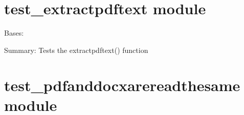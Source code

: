 \documentclass[letterpaper,10pt,english]{sphinxmanual}
\begin{document}
\section{test\_extractpdftext module}
\label{\detokenize{unit_tests:test-extractpdftext-module}}\label{\detokenize{unit_tests:module-unit_tests.test_extractpdftext}}

\begin{fulllineitems}
\label{\detokenize{unit_tests:unit_tests.test_extractpdftext.TestExtractpdftext}}
Bases: 

\begin{fulllineitems}
\label{\detokenize{unit_tests:unit_tests.test_extractpdftext.TestExtractpdftext.test_extractpdftext}}
Summary: Tests the extractpdftext() function

\end{fulllineitems}


\end{fulllineitems}



\section{test\_pdfanddocxarereadthesame module}
\label{\detokenize{unit_tests:module-unit_tests.test_pdfanddocxarereadthesame}}\label{\detokenize{unit_tests:test-pdfanddocxarereadthesame-module}}
\end{document}
